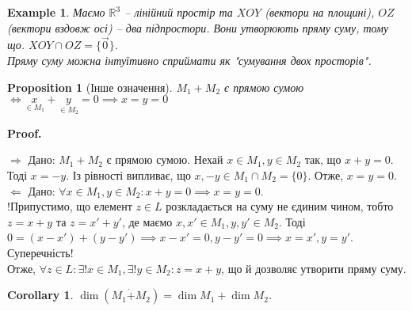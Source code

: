 \documentclass[a4paper, 10pt]{article}
\makeatletter
\def\rightproof{$\boxed{\Rightarrow}$ }
\def\leftproof{$\boxed{\Leftarrow}$ }
\theoremstyle{theoremdd}
\newtheorem{example}[theorem]{Example}
\newtheorem{proposition}[theorem]{Proposition}
\newtheorem{corollary}[theorem]{Corollary}
\renewenvironment{proof}[1][Proof.\\]{\par
\pushQED{\hfill \qed}%
\normalfont \topsep6\p@\@plus6\p@\relax
\trivlist
\item\relax
{\bfseries
#1\@addpunct{.}}\hspace\labelsep\ignorespaces
}{%
\popQED\endtrivlist\@endpefalse
}
\makeatother
\begin{document}
	\begin{example}
	Маємо $\mathbb{R}^3$ -- лінійний простір та $XOY$ (вектори на площині), $OZ$ (вектори вздовж осі) -- два підпростори. Вони утворюють пряму суму, тому що. $XOY \cap OZ = \{\vec{0}\}$.\\
	Пряму суму можна інтуїтивно сприймати як "сумування двох просторів".
	\end{example}
	
	\begin{proposition}[Інше означення]
	$M_1+M_2$ є прямою сумою $\iff \underset{\in M_1}{x}+\underset{\in M_2}{y} = 0 \implies x=y=0$
	\end{proposition}
	
	\begin{proof}
	\rightproof Дано: $M_1+M_2$ є прямою сумою. Нехай $x \in M_1, y \in M_2$ так, що $x + y = 0$.\\
	Тоді $x = -y$. Із рівності випливає, що $x,-y \in M_1 \cap M_2 = \{0\}$. Отже, $x = y = 0$.
	\bigskip \\
	\leftproof Дано: $\forall x \in M_1, y \in M_2: x+y=0 \implies x=y=0$.\\
	!Припустимо, що елемент $z \in L$ розкладається на суму не єдиним чином, тобто \\
	$z = x+y$ та $z = x'+y'$, де маємо $x,x' \in M_1, y,y' \in M_2$. Тоді\\
	$0 = (x-x') + (y-y') \implies x-x'=0, y-y'=0 \implies x=x', y=y'$. Суперечність!\\
	Отже, $\forall z \in L: \exists ! x \in M_1, \exists ! y \in M_2: z = x+y$, що й дозволяє утворити пряму суму.
	\end{proof}
	
	\begin{corollary}
	$\dim{(M_1 \dot{+} M_2)} = \dim{M_1} + \dim{M_2}$.
	\end{corollary}
	
\end{document}
